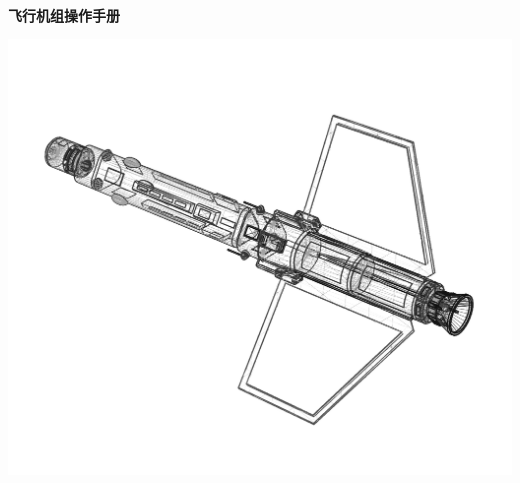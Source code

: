 \begin{titlepage}
	\begin{center}
		\vspace{1cm}
		{}\\
		\vspace{1.5cm}
		{\Large \textbf{{飞行机组操作手册}}}\\
		\vspace{2.5cm}
		\begin{center}
			\includegraphics[width=0.7\linewidth]{Picture/F9_titlepic}
		\end{center}
		\vfill
		\vspace{1.8cm}
		\doclicenseThis
	\end{center}
\end{titlepage}